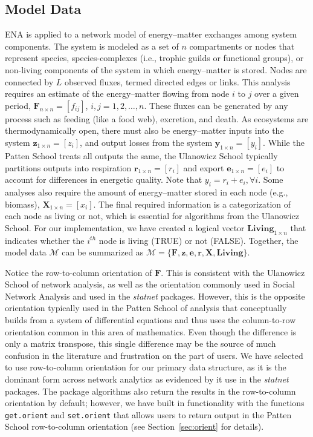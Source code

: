 \documentclass[11pt]{article}
\begin{document}
\subsection{Model Data} \label{sec:data}
ENA is applied to a network model of energy--matter exchanges among
system components.  The system is modeled as a set of $n$ compartments
or nodes that represent species, species-complexes (i.e., trophic
guilds or functional groups), or non-living components of the system
in which energy--matter is stored.  Nodes are connected by $L$
observed fluxes, termed directed edges or links.  This analysis
requires an estimate of the energy--matter flowing from node $i$ to
$j$ over a given period, $\mathbf{F}_{n\times n}=[f_{ij}]$,
$i,j=1,2,\ldots,n$.  These fluxes can be generated by any process such
as feeding (like a food web), excretion, and death.  As ecosystems are
thermodynamically open, there must also be energy--matter inputs into
the system $\mathbf{z}_{1 \times n}=[z_i]$, and output losses from the
system $\mathbf{y}_{1 \times n}=[y_i]$.  While the Patten School treats
all outputs the same, the Ulanowicz School typically partitions
outputs into respiration $\mathbf{r}_{1\times n}=[r_i]$ and export
$\mathbf{e}_{1\times n}=[e_i]$ to account for differences in energetic
quality. Note that $y_i = r_i + e_i, \forall i$.  Some analyses
also require the amount of energy--matter stored in each node (e.g.,
biomass), $\mathbf{X}_{1\times n}=[x_i]$.  The final required
information is a categorization of each node as living or not, which
is essential for algorithms from the Ulanowicz School.  For
our implementation, we have created a logical vector $\mathbf{Living}_{1 \times
  n}$ that indicates whether the $i^{th}$ node is living (TRUE)
or not (FALSE).  Together, the model data $\mathcal{M}$ can be
summarized as $\mathcal{M} =
\{\mathbf{F}, \mathbf{z}, \mathbf{e}, \mathbf{r}, \mathbf{X}, \mathbf{Living}\}$.


Notice the row-to-column orientation of $\mathbf{F}$.  This is
consistent with the Ulanowicz School of network analysis, as well as
the orientation commonly used in Social Network Analysis and used in
the \textit{statnet} packages.  However, this is the opposite
orientation typically used in the Patten School of analysis that
conceptually builds from a system of differential equations and thus
uses the column-to-row orientation common in this area of
mathematics. Even though the difference is only a matrix transpose,
this single difference may be the source of much confusion in the
literature and frustration on the part of users.  We have selected to
use row-to-column orientation for our primary data structure, as it is
the dominant form across network analytics as evidenced by it use in
the \textit{statnet} packages. The package algorithms also return the
results in the row-to-column orientation by default; however, we have
built in functionality with the functions \texttt{get.orient} and
\texttt{set.orient}  that allows users
to return output in the Patten School row-to-column orientation
(see Section~\ref{sec:orient} for details).
\end{document}
